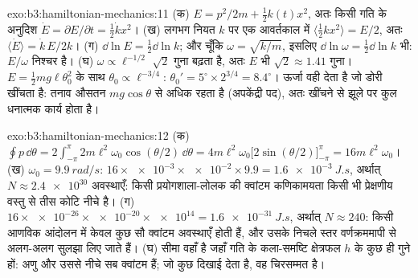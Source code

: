 \begin{solution}{exo:b3:hamiltonian-mechanics:11}
(क) $E = p^2/2m + \tfrac12 k(t)x^2$, अतः किसी गति के अनुदिश $\dot E =
\partial E/\partial t = \tfrac12\dot kx^2$। (ख) लगभग नियत $k$ पर एक
आवर्तकाल में $\langle\tfrac12 kx^2\rangle = E/2$, अतः
$\langle\dot E\rangle = \dot k\,E/2k$। (ग) $\dd\ln E = \tfrac12\dd\ln
k$; और चूँकि $\omega = \sqrt{k/m}$, इसलिए $\dd\ln\omega = \tfrac12\dd\ln k$
भी: $E/\omega$ निश्चर है। (घ) $\omega \propto \ell^{-1/2}$
$\sqrt2$ गुना बढ़ता है, अतः $E$ भी $\sqrt2 \approx 1.41$ गुना। $E = \tfrac12
mg\ell\theta_0^2$ के साथ $\theta_0 \propto \ell^{-3/4}$: $\theta_0' =
5^\circ \times 2^{3/4} = 8.4^\circ$। ऊर्जा वही देता है जो डोरी
खींचता है: तनाव औसतन $mg\cos\theta$ से अधिक रहता है
(अपकेंद्री पद), अतः खींचने से झूले पर कुल धनात्मक कार्य होता है।
\end{solution}

\begin{solution}{exo:b3:hamiltonian-mechanics:12}
(क) $\oint p\,\dd\theta = 2\int_{-\pi}^{\pi}2m\ell^2\omega_0
\cos(\theta/2)\,\dd\theta = 4m\ell^2\omega_0\big[2\sin(\theta/2)
\big]_{-\pi}^{\pi} = 16m\ell^2\omega_0$। (ख) $\omega_0 =
\qty{9.9}{rad/s}$: $16 \times \num{e-3} \times \num{e-2} \times 9.9 =
\qty{1.6e-3}{J.s}$, अर्थात् $N \approx \num{2.4e30}$ अवस्थाएँ: किसी
प्रयोगशाला-लोलक की क्वांटम कणिकामयता किसी भी प्रेक्षणीय वस्तु से तीस
कोटि नीचे है। (ग) $16 \times \num{e-26} \times
\num{e-20} \times \num{e14} = \qty{1.6e-31}{J.s}$, अर्थात् $N \approx
240$: किसी आणविक आंदोलन में केवल कुछ सौ क्वांटम अवस्थाएँ होती हैं,
और उसके निचले स्तर वर्णक्रममापी से अलग-अलग सुलझा लिए जाते हैं। (घ) सीमा
वहाँ है जहाँ गति के कला-समष्टि क्षेत्रफल
$h$ के कुछ ही गुने हों: अणु और उससे नीचे सब क्वांटम हैं; जो कुछ दिखाई
देता है, वह चिरसम्मत है।
\end{solution}

